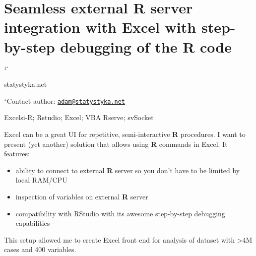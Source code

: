 \documentclass[\main/boa.tex]{subfiles}
\begin{document}
\section{Seamless external R server integration with Excel with step-by-step
debugging of the R code}

\begin{center}
  {\bf {}$^{1^\star}$}
\end{center}

\vskip 0.3cm

\begin{affiliations}
\begin{enumerate}
\begin{minipage}{0.915\textwidth}
\centering
\item statystyka.net \\[-2pt]
\end{minipage}
\end{enumerate}
$^\star$Contact author: \href{mailto:adam@statystyka.net}{\nolinkurl{adam@statystyka.net}}\\
\end{affiliations}

\vskip 0.5cm

\begin{minipage}{0.915\textwidth}
\keywords Excelsi-R; Rstudio; Excel; VBA
\packages Rserve; svSocket
\end{minipage}

\vskip 0.8cm

Excel can be a great UI for repetitive, semi-interactive \textbf{R}
procedures. I want to present (yet another) solution that allows using
\textbf{R} commands in Excel. It features:

\begin{itemize}
\tightlist
\item
  ability to connect to external \textbf{R} server so you don't have to
  be limited by local RAM/CPU
\item
  inspection of variables on external \textbf{R} server
\item
  compatibility with RStudio with its awesome step-by-step debugging
  capabilities
\end{itemize}

This setup allowed me to create Excel front end for analysis of dataset
with \textgreater{}4M cases and 400 variables.
\end{document}
